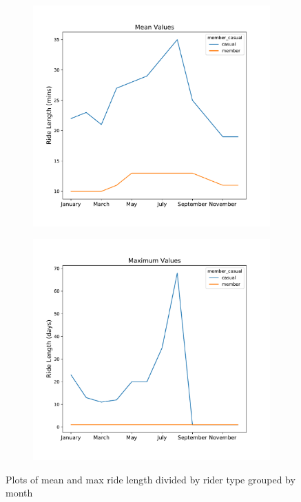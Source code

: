 \documentclass[12pt]{article}
\begin{document}
\begin{itemize}
	\begin{figure}[h]
	\centering
	\begin{subfigure}{.45\textwidth}
		\includegraphics[scale=0.48]{mean_cvsm_month.pdf} 
	\end{subfigure}
	\begin{subfigure}{.4\textwidth}
		\includegraphics[scale=0.48]{max_cvsm.pdf}
	\end{subfigure}
	\caption{Plots of mean and max ride length divided by rider type grouped by month}
	\label{fig12}
	\end{figure}
	

\end{itemize}
\end{document}
